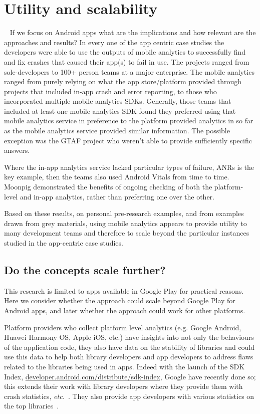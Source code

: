 \section{Utility and scalability}~\label{discussion-utility-and-scalability}
If we focus on Android apps what are the implications and how relevant are the approaches and results? In every one of the app centric case studies the developers were able to use the outputs of mobile analytics to successfully find and fix crashes that caused their app(s) to fail in use. The projects ranged from sole-developers to 100+ person teams at a major enterprise. The mobile analytics ranged from purely relying on what the app store/platform provided through projects that included in-app crash and error reporting, to those who incorporated multiple mobile analytics SDKs. Generally, those teams that included at least one mobile analytics SDK found they preferred using that mobile analytics service in preference to the platform provided analytics in so far as the mobile analytics service provided similar information. The possible exception was the GTAF project who weren't able to provide sufficiently specific answers. 

Where the in-app analytics service lacked particular types of failure, ANRs is the key example, then the teams also used Android Vitals from time to time. Moonpig demonstrated the benefits of ongoing checking of both the platform-level and in-app analytics, rather than preferring one over the other.

Based on these results, on personal pre-research examples, and from examples drawn from grey materials, using mobile analytics appears to provide utility to many development teams and therefore to scale beyond the particular instances studied in the app-centric case studies.

\subsection{Do the concepts scale further?}
This research is limited to apps available in Google Play for practical reasons. Here we consider whether the approach could scale beyond Google Play for Android apps, and later whether the approach could work for other platforms.

Platform providers who collect platform level analytics (e.g. Google Android, Huawei Harmony OS, Apple iOS, etc.) have insights into not only the behaviours of the application code, they also have data on the stability of libraries and could use this data to help both library developers and app developers to address flaws related to the libraries being used in apps. Indeed with the launch of the SDK Index, \href{https://developer.android.com/distribute/sdk-index}{developer.android.com/distribute/sdk-index}, Google have recently done so; this extends their work with library developers where they provide them with crash statistics, \emph{etc.}~. They also provide app developers with various statistics on the top libraries~.

